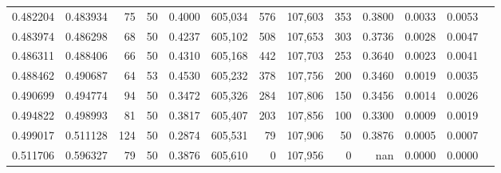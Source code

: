 \begin{tabular}{rrrrrrrrrrrrr}
0.482204 & 0.483934 &    75 &  50 &                                     0.4000 & 605,034 &     576 & 107,603 &     353 & 0.3800 & 0.0033 & 0.0053 \\
0.483974 & 0.486298 &    68 &  50 &                                     0.4237 & 605,102 &     508 & 107,653 &     303 & 0.3736 & 0.0028 & 0.0047 \\
0.486311 & 0.488406 &    66 &  50 &                                     0.4310 & 605,168 &     442 & 107,703 &     253 & 0.3640 & 0.0023 & 0.0041 \\
0.488462 & 0.490687 &    64 &  53 &                                     0.4530 & 605,232 &     378 & 107,756 &     200 & 0.3460 & 0.0019 & 0.0035 \\
0.490699 & 0.494774 &    94 &  50 &                                     0.3472 & 605,326 &     284 & 107,806 &     150 & 0.3456 & 0.0014 & 0.0026 \\
0.494822 & 0.498993 &    81 &  50 &                                     0.3817 & 605,407 &     203 & 107,856 &     100 & 0.3300 & 0.0009 & 0.0019 \\
0.499017 & 0.511128 &   124 &  50 &                                     0.2874 & 605,531 &      79 & 107,906 &      50 & 0.3876 & 0.0005 & 0.0007 \\
0.511706 & 0.596327 &    79 &  50 &                                     0.3876 & 605,610 &       0 & 107,956 &       0 &    nan & 0.0000 & 0.0000 \\
\bottomrule
\end{tabular}
